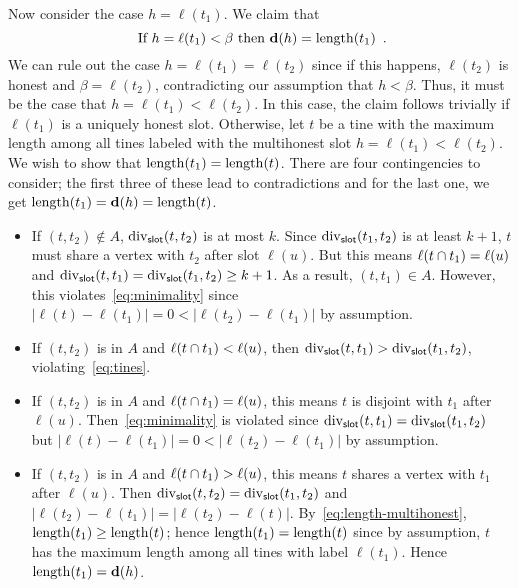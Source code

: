     Now consider the case $h = \ell(t_1)$. 
    We claim that 
    \begin{equation}\label{eq:hdepth-t1}
      \text{
        If $h = \ell(t_1) < \beta$ then $\mathbf{d}(h) = \operatorname{length}(t_1)$ 
        }
      \,.
    \end{equation}
    We can rule out the case $h = \ell(t_1) = \ell(t_2)$ 
    since if this happens, 
    $\ell(t_2)$ is honest and $\beta = \ell(t_2)$, 
    contradicting our assumption that $h < \beta$. 
    Thus, it must be the case that $h = \ell(t_1) < \ell(t_2)$.    
    In this case, the claim follows trivially 
    if $\ell(t_1)$ is a uniquely honest slot. 
    Otherwise, let $t$ be a tine 
    with the maximum length among all tines 
    labeled with the multihonest slot $h = \ell(t_1) < \ell(t_2)$. 
    We wish to show that $\operatorname{length}(t_1) = \operatorname{length}(t)$. 
    There are four contingencies to consider; 
    the first three of these lead to contradictions 
    and for the last one, we get $\operatorname{length}(t_1) = \mathbf{d}(h) = \operatorname{length}(t)$.
    \begin{itemize}

      \item If $(t, t_2) \not \in A$, 
      $\mathrm{div}_{\mathsf{slot}}(t, t_2)$ is at most $k$.
      Since $\mathrm{div}_{\mathsf{slot}}(t_1, t_2)$ is at least $k + 1$, 
      $t$ must share a vertex with $t_2$ after slot $\ell(u)$. 
      But this means $\ell(t \cap t_1) = \ell(u)$ 
      and $\mathrm{div}_{\mathsf{slot}}(t, t_1) = \mathrm{div}_{\mathsf{slot}}(t_1, t_2) \geq k + 1$. 
      As a result, $(t, t_1) \in A$. 
      However, this violates~\eqref{eq:minimality} 
      since $|\ell(t) - \ell(t_1)| = 0 < |\ell(t_2) - \ell(t_1)|$ by assumption. 

      \item 
      If $(t, t_2)$ is in $A$ and 
      $\ell(t \cap t_1) < \ell(u)$, 
      then $\mathrm{div}_{\mathsf{slot}}(t, t_1) > \mathrm{div}_{\mathsf{slot}}(t_1, t_2)$, 
      violating~\eqref{eq:tines}. 

      \item 
      If $(t, t_2)$ is in $A$ and 
      $\ell(t \cap t_1) = \ell(u)$, 
      this means $t$ is disjoint with $t_1$ after $\ell(u)$. 
      Then~\eqref{eq:minimality} is violated 
      since $\mathrm{div}_{\mathsf{slot}}(t, t_1) = \mathrm{div}_{\mathsf{slot}}(t_1, t_2)$ but 
      $|\ell(t) - \ell(t_1)| = 0 < |\ell(t_2) - \ell(t_1)|$ by assumption. 

      \item 
      If $(t, t_2)$ is in $A$ and 
      $\ell(t \cap t_1) > \ell(u)$, 
      this means $t$ shares a vertex with $t_1$ after $\ell(u)$. 
      Then $\mathrm{div}_{\mathsf{slot}}(t, t_2) = \mathrm{div}_{\mathsf{slot}}(t_1, t_2)$ 
      and $|\ell(t_2) - \ell(t_1)| = |\ell(t_2) - \ell(t)|$. 
      By~\eqref{eq:length-multihonest}, 
      $\operatorname{length}(t_1) \geq \operatorname{length}(t)$; 
      hence $\operatorname{length}(t_1) = \operatorname{length}(t)$ since by assumption, 
      $t$ has the maximum length among all tines with label $\ell(t_1)$. 
      Hence $\operatorname{length}(t_1) = \mathbf{d}(h)$.

    \end{itemize}
